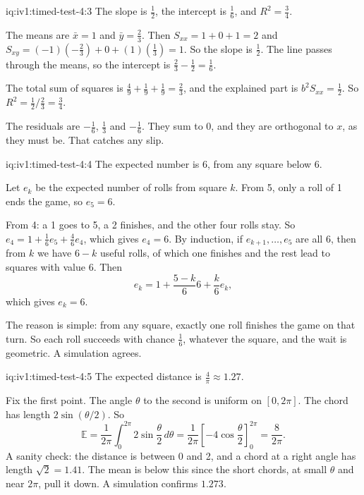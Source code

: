 \enlargethispage{-3\baselineskip}%
\begin{solution}{iq:iv1:timed-test-4:3}
The slope is $\frac12$, the intercept is $\frac16$, and $R^2 = \frac34$.

The means are $\bar{x} = 1$ and $\bar{y} = \frac23$. Then $S_{xx} = 1 + 0 + 1 = 2$ and $S_{xy} = (-1)(-\frac23) + 0 + (1)(\frac13) = 1$. So the slope is $\frac12$. The line passes through the means, so the intercept is $\frac23 - \frac12 = \frac16$.

The total sum of squares is $\frac49 + \frac19 + \frac19 = \frac23$, and the explained part is $b^2S_{xx} = \frac12$. So $R^2 = \frac12/\frac23 = \frac34$.

The residuals are $-\frac16$, $\frac13$ and $-\frac16$. They sum to 0, and they are orthogonal to $x$, as they must be. That catches any slip.

\end{solution}

\begin{solution}{iq:iv1:timed-test-4:4}
The expected number is 6, from any square below 6.

Let $e_k$ be the expected number of rolls from square $k$. From 5, only a roll of 1 ends the game, so $e_5 = 6$.

From 4: a 1 goes to 5, a 2 finishes, and the other four rolls stay. So $e_4 = 1 + \frac16e_5 + \frac46e_4$, which gives $e_4 = 6$. By induction, if $e_{k + 1}, \dots, e_5$ are all 6, then from $k$ we have $6 - k$ useful rolls, of which one finishes and the rest lead to squares with value 6. Then
\[
e_k = 1 + \frac{5 - k}{6}6 + \frac{k}{6}e_k,
\]
which gives $e_k = 6$.

The reason is simple: from any square, exactly one roll finishes the game on that turn. So each roll succeeds with chance $\frac16$, whatever the square, and the wait is geometric. A simulation agrees.

\end{solution}

\begin{solution}{iq:iv1:timed-test-4:5}
The expected distance is $\frac{4}{\pi} \approx 1.27$.

Fix the first point. The angle $\theta$ to the second is uniform on $[0, 2\pi]$. The chord has length $2\sin(\theta/2)$. So
\[
\mathbb{E} = \frac{1}{2\pi}\int_0^{2\pi}2\sin\frac{\theta}{2}\,d\theta = \frac{1}{2\pi}\left[-4\cos\frac{\theta}{2}\right]_0^{2\pi} = \frac{8}{2\pi}.
\]
A sanity check: the distance is between 0 and 2, and a chord at a right angle has length $\sqrt{2} = 1.41$. The mean is below this since the short chords, at small $\theta$ and near $2\pi$, pull it down. A simulation confirms $1.273$.

\end{solution}

